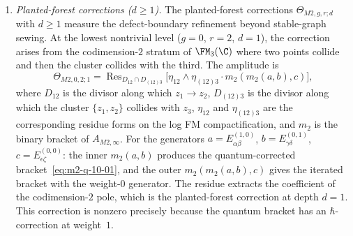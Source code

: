 \begin{theorem}
\begin{enumerate}[label=(\roman*),leftmargin=1.8em]
\item \emph{Planted-forest corrections ($d\ge 1$).}
The planted-forest corrections $\Theta_{M2,g,r;d}$ with
$d\ge 1$ measure the defect-boundary refinement beyond
stable-graph sewing. At the lowest nontrivial level
($g=0$, $r=2$, $d=1$), the correction arises from the
codimension-$2$ stratum of $\FM_3(\C)$ where two points
collide and then the cluster collides with the third.
The amplitude is
\begin{equation}%
\Theta_{M2,0,2;1}
= \operatorname{Res}_{D_{12}\cap D_{(12)3}}
\bigl[\eta_{12}\wedge\eta_{(12)3}\cdot
m_2(m_2(a,b),c)\bigr],
\end{equation}
where $D_{12}$ is the divisor along which $z_1\to z_2$,
$D_{(12)3}$ is the divisor along which the cluster
$\{z_1,z_2\}$ collides with $z_3$, $\eta_{12}$ and
$\eta_{(12)3}$ are the corresponding residue forms on
the log FM compactification, and $m_2$ is the binary
bracket of $A_{M2,\infty}$. For the generators
$a=E^{(1,0)}_{\alpha\beta}$, $b=E^{(0,1)}_{\gamma\delta}$,
$c=E^{(0,0)}_{\epsilon\zeta}$: the inner $m_2(a,b)$
produces the quantum-corrected bracket~\eqref{eq:m2-q-10-01},
and the outer $m_2(m_2(a,b),c)$ gives the iterated bracket
with the weight-$0$ generator. The residue extracts the
coefficient of the codimension-$2$ pole, which is the
planted-forest correction at depth $d=1$. This correction
is nonzero precisely because the quantum bracket has an
$\hbar$-correction at weight~$1$.
\end{enumerate}
\end{theorem}

